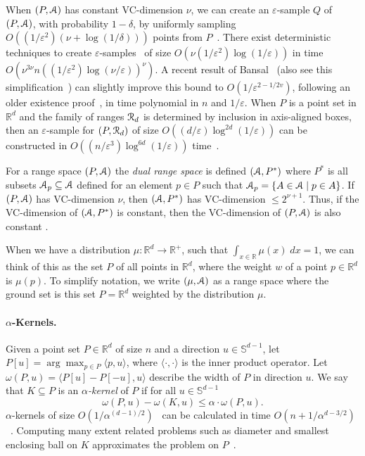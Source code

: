 \documentclass{journal}
\newcommand{\eps}{\varepsilon}
\newcommand{\Eu}[1]{\ensuremath{\EuScript{#1}}}
\renewcommand{\b}[1]{\ensuremath{\mathbb{#1}}}
\newcommand{\R}{\ensuremath{\mathbb{R}}}
\newcommand{\IP}[2]{\ensuremath{ \langle #1 , #2 \rangle}}
\newcommand{\wid}{\omega}
\begin{document}
When $(P, \Eu{A})$ has constant VC-dimension $\nu$, we can create an $\eps$-sample $Q$ of $(P, \Eu{A})$, with probability $1-\delta$, by uniformly sampling $O((1/\eps^2)(\nu + \log (1/\delta) ))$ points from $P$~\cite{VC71,LLS01}.  There exist deterministic techniques to create $\eps$-samples~\cite{Mat91,CM96} of size $O(\nu (1/\eps^2) \log (1/\eps))$ in time $O(\nu^{3\nu} n ((1/\eps^2) \log (\nu/\eps))^\nu)$.
A recent result of Bansal~\cite{Ban10} (also see this simplification~\cite{LM12}) can slightly improve this bound to $O(1/\eps^{2-1/2v})$, following an older existence proof~\cite{MWW93}, in time polynomial in $n$ and $1/\eps$.  
When $P$ is a point set in $\R^d$ and the family of ranges $\Eu{R}_d$ is determined by inclusion in axis-aligned boxes, then an $\eps$-sample for $(P, \Eu{R}_d)$ of size $O((d/\eps) \log^{2d} (1/\eps))$ can be constructed in $O((n/\eps^3) \log^{6d} (1/\eps))$ time~\cite{Phi08}.

For a range space $(P, \Eu{A})$ the \emph{dual range space} is defined $(\Eu{A}, P^*)$ where $P^*$ is all subsets $\Eu{A}_p \subseteq \Eu{A}$ defined for an element $p \in P$ such that $\Eu{A}_p = \{A \in \Eu{A} \mid p \in A\}$.  If $(P,\Eu{A})$ has VC-dimension $\nu$, then $(\Eu{A}, P^*)$ has VC-dimension $\leq 2^{\nu+1}$.  Thus, if the VC-dimension of $(\Eu{A}, P^*)$ is constant, then the VC-dimension of $(P,\Eu{A})$ is also constant \cite{Mat99}.  


When we have a distribution $\mu : \R^d \to \R^+$, such that $\int_{x \in \R} \mu(x) \; dx = 1$, we can think of this as the set $P$ of all points in $\R^d$, where the weight $w$ of a point $p \in \R^d$ is $\mu(p)$.  
To simplify notation, we write $(\mu, \Eu{A})$ as a range space where the ground set is this set $P = \R^d$ weighted by the distribution $\mu$.


\paragraph{$\alpha$-Kernels.}
Given a point set $P \in \R^d$ of size $n$ and a direction $u \in \b{S}^{d-1}$, let $P[u] = \arg\max_{p \in P} \IP{p}{u}$, where $\IP{\cdot}{\cdot}$ is the inner product operator.
Let $\wid(P,u) = \IP{P[u] - P[-u]}{u}$ describe the width of $P$ in direction $u$.
We say that $K \subseteq P$ is an \emph{$\alpha$-kernel} of $P$ if for all $u \in \b{S}^{d-1}$
\[
\wid(P,u) - \wid(K,u) \leq \alpha \cdot \wid(P,u).
\]
$\alpha$-kernels of size $O(1/\alpha^{(d-1)/2})$~\cite{AHV04} can be calculated in time $O(n + 1/\alpha^{d-3/2})$~\cite{Cha06,YAPV04}.  Computing many extent related problems such as diameter and smallest enclosing ball on $K$ approximates the problem on $P$~\cite{AHV04,AHV07,Cha06}.
\end{document}
